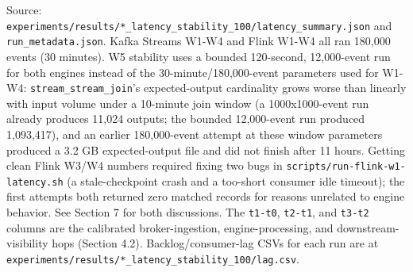 Source:
\texttt{experiments/results/*\_latency\_stability\_100/latency\_summary.json}
and \texttt{run\_metadata.json}. Kafka Streams W1-W4 and Flink W1-W4 all
ran 180,000 events (30 minutes). W5 stability uses a bounded 120-second,
12,000-event run for both engines instead of the 30-minute/180,000-event
parameters used for W1-W4: \texttt{stream\_stream\_join}'s
expected-output cardinality grows worse than linearly with input volume
under a 10-minute join window (a 1000x1000-event run already produces
11,024 outputs; the bounded 12,000-event run produced 1,093,417), and an
earlier 180,000-event attempt at these window parameters produced a 3.2
GB expected-output file and did not finish after 11 hours. Getting clean
Flink W3/W4 numbers required fixing two bugs in
\texttt{scripts/run-flink-w1-latency.sh} (a stale-checkpoint crash and a
too-short consumer idle timeout); the first attempts both returned zero
matched records for reasons unrelated to engine behavior. See Section 7
for both discussions. The \texttt{t1-t0}, \texttt{t2-t1}, and
\texttt{t3-t2} columns are the calibrated broker-ingestion,
engine-processing, and downstream-visibility hops (Section 4.2).
Backlog/consumer-lag CSVs for each run are at
\texttt{experiments/results/*\_latency\_stability\_100/lag.csv}.

